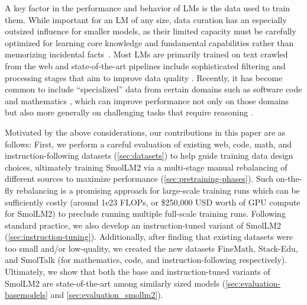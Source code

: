 \documentclass{article}
\theoremstyle{plain}
\theoremstyle{definition}
\theoremstyle{remark}
\begin{document}
A key factor in the performance and behavior of LMs is the data used to train them.
While important for an LM of any size, data curation has an especially outsized influence for smaller models, as their limited capacity must be carefully optimized for learning core knowledge and fundamental capabilities rather than memorizing incidental facts~\cite{abdin2024phi3,rolnick1705deep}. 
Most LMs are primarily trained on text crawled from the web \cite{radford2019language,raffel2020exploring} and state-of-the-art pipelines include sophisticated filtering and processing stages that aim to improve data quality \cite{li2024datacomp,penedo2024refinedweb,Penedo2024TheFD,soldaini2024dolma}.
Recently, it has become common to include ``specialized'' data from certain domains such as software code \cite{kocetkov2022stack,lozhkov2024starcoder} and mathematics \cite{paster2023openwebmath,han2024infimm}, which can improve performance not only on those domains but also more generally on challenging tasks that require reasoning \cite{muennighoff2023scaling,aryabumi2024code}.

Motivated by the above considerations, our contributions in this paper are as follows:
First, we perform a careful evaluation of existing web, code, math, and instruction-following datasets (\cref{sec:datasets}) to help guide training data design choices, ultimately training SmolLM2 via a multi-stage manual rebalancing of different sources to maximize performance (\cref{sec:pretraining-phases}).
Such on-the-fly rebalancing is a promising approach for large-scale training runs which can be sufficiently costly (around 1e23 FLOPs, or \$250,000 USD worth of GPU compute for SmolLM2) to preclude running multiple full-scale training runs.
Following standard practice, we also develop an instruction-tuned variant of SmolLM2 (\cref{sec:instruction-tuning}).
Additionally, after finding that existing datasets were too small and/or low-quality, we created the new datasets FineMath, Stack-Edu, and SmolTalk (for mathematics, code, and instruction-following respectively).
Ultimately, we show that both the base and instruction-tuned variants of SmolLM2 are state-of-the-art among similarly sized models (\cref{sec:evaluation-basemodels} and \cref{sec:evaluation_smollm2}).

\vspace{-0.25cm} 
\end{document}

